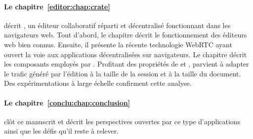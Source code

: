 \paragraph{Le chapitre~\ref{editor:chap:crate}} décrit \CRATE, un éditeur
collaboratif réparti et décentralisé fonctionnant dans les navigateurs web.
Tout d'abord, le chapitre décrit le fonctionnement des éditeurs web bien connus.
Ensuite, il présente la récente technologie WebRTC ayant ouvert la voie aux
applications décentralisées sur navigateurs. Le chapitre décrit les composants
employés par \CRATE.  Profitant des propriétés de \SPRAY et \LSEQ, \CRATE
parvient à adapter le trafic généré par l'édition à la taille de la session et à
la taille du document. Des expérimentations à large échelle confirment cette
analyse.

\paragraph{Le chapitre~\ref{conclu:chap:conclusion}} clôt ce manuscrit et décrit
les perspectives ouvertes par ce type d'applications ainsi que les défis qu'il
reste à relever.


